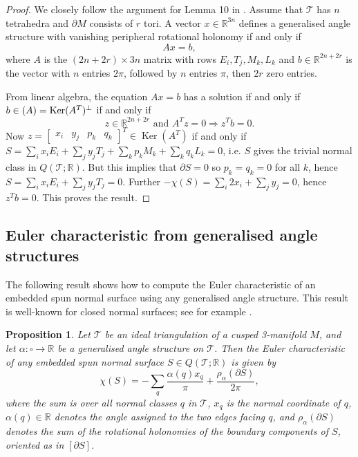 \documentclass[12pt,reqno]{amsart}  %
\newtheorem{prop}[thm]{Proposition}
\theoremstyle{definition}
\theoremstyle{remark}
\def\R{\mathbb{R}}
\def\be{  \begin{equation} }
\def\ee{  \end{equation} }
\newcommand{\T}{\mathcal{T}}
\def\bd{\partial}
\DeclareMathOperator{\Ker}{Ker}
\let\Im\relax
\DeclareMathOperator{\Im}{Im}
\def\quads{\square}  %
\begin{document}
\begin{proof} 
We closely follow the argument for Lemma 10 in \cite{LT}. %
Assume that $\T$ has $n$ tetrahedra and $\bd M$ consists of $r$ tori. 
A vector $x \in \R^{3n}$ defines a generalised angle structure with vanishing 
peripheral rotational holonomy if and only if 
$$
Ax=b,
$$ 
where
$A$ is the $(2n+2r) \times 3n$ matrix with rows $E_i, T_j, M_k, L_k$
and $b \in \R^{2n+2r}$ is the vector with $n$ entries $2\pi$, followed by $n$ 
entries $\pi$, then $2r$ zero entries.

From linear algebra, the equation $Ax=b$ has a solution if and only if 
$b \in \Im(A)=\Ker(A^T)^\perp$
if and only if 
$$
z \in \R^{2n+2r} \text{ and } A^Tz=0 \Rightarrow z^T b = 0.
$$
Now
$z= \begin{bmatrix} x_i & y_j &p_k &q_k\end{bmatrix}^T \in \Ker(A^T)$
if and only if
$S= \sum_i x_i E_i + \sum_j y_j T_j + \sum_k p_k M_k + \sum_k q_k L_k =0$,
i.e. $S$ gives the trivial normal class in $Q(\T;\R)$. But this implies that 
$\bd S=0$ so $p_k=q_k=0$ for all $k$, hence 
$S= \sum_i x_i E_i + \sum_j y_j T_j=0$.
Further $-\chi(S)=\sum_i 2 x_i + \sum_j  y_j =0$, hence  $z^T b = 0$.  
This proves the result.
\end{proof}

\subsection{Euler characteristic from generalised angle structures}

The following result shows how to compute the Euler characteristic of an 
embedded spun normal surface using any generalised angle structure. 
This result is well-known for closed normal surfaces; see for 
example \cite[Lemma 15]{LT}.

\begin{prop}
\label{prop_euler_from_ang_str}
Let $\T$ be an ideal triangulation of a cusped 3-manifold $M$, and 
let $\alpha : \quads \to \R$ be a generalised angle structure on $\T$. 
Then the Euler characteristic of any embedded spun normal surface 
$S \in Q(\T;\R)$ is given by
\be 
\label{euler_from_gen_ang_struct}
\chi(S) = 
- \sum_q \frac{\alpha(q) x_q}{\pi} + \frac{ \rho_\alpha(\bd S)}{2\pi},
\ee
where the sum is over all normal classes $q$ in $\T$, $x_q$ is the normal 
coordinate of $q$, $\alpha(q) \in \R$ denotes the angle assigned to the 
two edges facing $q$, and $\rho_\alpha(\bd S)$ denotes the sum of the 
rotational holonomies of the boundary components of $S$, 
oriented as in $[\bd S]$.
\end{prop}
\end{document}
